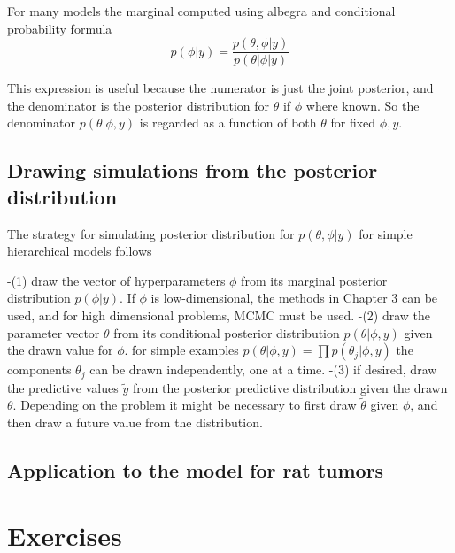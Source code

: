 \documentclass[
]{book}
\theoremstyle{definition}
\theoremstyle{definition}
\theoremstyle{definition}
\theoremstyle{definition}
\theoremstyle{remark}
\begin{document}
For many models the marginal computed using albegra and conditional probability formula
\begin{equation}
p(\phi|y) = \frac{ p(\theta,\phi|y)}{ p(\theta|\phi|y)}
\label{eq:fiveFive}
\end{equation}

This expression is useful because the numerator is just the joint posterior, and the denominator is the posterior distribution for \(\theta\) if \(\phi\) where known. So the denominator \(p(\theta| \phi, y)\) is regarded as a function of both \(\theta\) for fixed \(\phi, y\).

\hypertarget{drawing-simulations-from-the-posterior-distribution}{%
\subsection*{Drawing simulations from the posterior distribution}\label{drawing-simulations-from-the-posterior-distribution}}

The strategy for simulating posterior distribution for \(p(\theta,\phi | y)\) for simple hierarchical models follows

-(1) draw the vector of hyperparameters \(\phi\) from its marginal posterior distribution \(p(\phi | y)\). If \(\phi\) is low-dimensional, the methods in Chapter 3 can be used, and for high dimensional problems, MCMC must be used.
-(2) draw the parameter vector \(\theta\) from its conditional posterior distribution \(p(\theta| \phi, y)\) given the drawn value for \(\phi\). for simple examples \(p(\theta | \phi, y) = \prod p(\theta_j | \phi, y)\) the components \(\theta_j\) can be drawn independently, one at a time.
-(3) if desired, draw the predictive values \(\tilde{y}\) from the posterior predictive distribution given the drawn \(\theta\). Depending on the problem it might be necessary to first draw \(\tilde{\theta}\) given \(\phi\), and then draw a future value from the distribution.

\hypertarget{application-to-the-model-for-rat-tumors}{%
\subsection*{Application to the model for rat tumors}\label{application-to-the-model-for-rat-tumors}}

\hypertarget{exercises-4}{%
\section*{Exercises}\label{exercises-4}}
\end{document}
